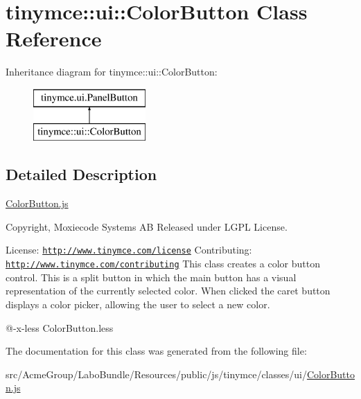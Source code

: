 \hypertarget{classtinymce_1_1ui_1_1_color_button}{\section{tinymce\+:\+:ui\+:\+:Color\+Button Class Reference}
\label{classtinymce_1_1ui_1_1_color_button}
}
Inheritance diagram for tinymce\+:\+:ui\+:\+:Color\+Button\+:\begin{figure}[H]
\begin{center}
\leavevmode
\includegraphics[height=2.000000cm]{classtinymce_1_1ui_1_1_color_button}
\end{center}
\end{figure}


\subsection{Detailed Description}
\hyperlink{_color_button_8js}{Color\+Button.\+js}

Copyright, Moxiecode Systems A\+B Released under L\+G\+P\+L License.

License\+: \href{http://www.tinymce.com/license}{\tt http\+://www.\+tinymce.\+com/license} Contributing\+: \href{http://www.tinymce.com/contributing}{\tt http\+://www.\+tinymce.\+com/contributing} This class creates a color button control. This is a split button in which the main button has a visual representation of the currently selected color. When clicked the caret button displays a color picker, allowing the user to select a new color.

@-\/x-\/less Color\+Button.\+less 

The documentation for this class was generated from the following file\+:\begin{DoxyCompactItemize}
\item 
src/\+Acme\+Group/\+Labo\+Bundle/\+Resources/public/js/tinymce/classes/ui/\hyperlink{_color_button_8js}{Color\+Button.\+js}\end{DoxyCompactItemize}
